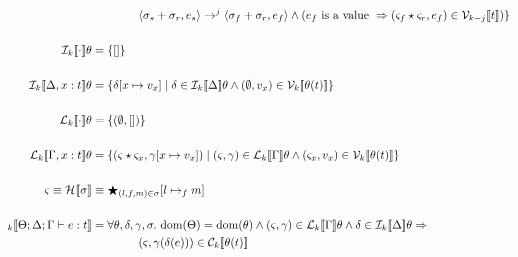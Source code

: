 \begin{align*}
               & \qquad \qquad \langle \sigma_s + \sigma_r, e_s \rangle \rightarrow^j \langle \sigma_f + \sigma_r, e_f \rangle \wedge ( e_f \textrm { is a value } \Rightarrow ( \varsigma_f \star \varsigma_r, e_f ) \in \V{k-j}{t} ) \} \\
\\
    \den{I}{k}{ \cdot } \theta &= \{ [] \} \\
\\
    \den{I}{k}{ \Delta, x : t } \theta &= \{ \delta[x \mapsto v_x ] \mid \delta \in \den{I}{k}{\Delta}\theta \wedge (\empH, v_x) \in \V{k}{\theta(t)} \} \\
\\
    \den{L}{k}{ \cdot } \theta &= \{ (\empH, []) \} \\
\\
    \den{L}{k}{ \Gamma, x : t } \theta &= \{ (\varsigma \star \varsigma_x, \gamma[x \mapsto v_x ]) \mid (\varsigma, \gamma) \in \den{L}{k}{\Gamma}\theta \wedge (\varsigma_x, v_x) \in \V{k}{\theta(t)} \} \\
\\
    \varsigma \equiv \den{H}{}{\sigma} &\equiv \bigstar_{(l,f,m) \in \sigma} [ l \mapsto_f m ]\\
\\
\den{}{k}{ \Theta; \Delta ; \Gamma \vdash e : t } &= \forall \theta, \delta, \gamma, \sigma.\ \dom(\Theta) = \dom(\theta) \wedge (\varsigma, \gamma) \in \den{L}{k}{ \Gamma }\theta \wedge \delta \in \den{I}{k}{ \Delta }\theta \Rightarrow \\
                                                 & \qquad \qquad (\varsigma, \gamma(\delta(e))) \in \C{k}{ \theta(t) }
\end{align*}
